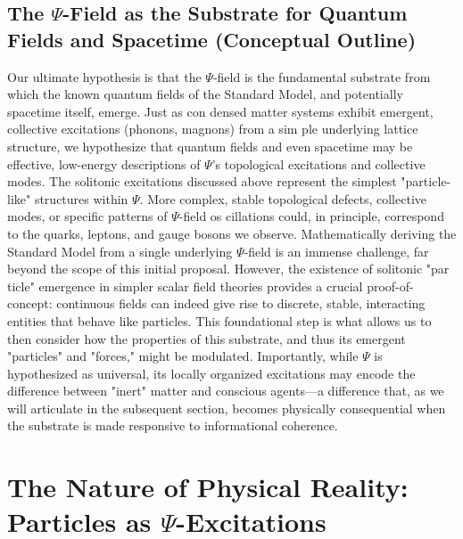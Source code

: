 \documentclass{report}
\begin{document}
    \subsection{The $\Psi$-Field as the Substrate for Quantum Fields and Spacetime (Conceptual Outline)}
    \label{subsec:psi_substrate_qft_st}
    Our ultimate hypothesis is that the $\Psi$-field is the fundamental substrate from which the known
    quantum fields of the Standard Model, and potentially spacetime itself, emerge. Just as con densed matter systems exhibit emergent, collective excitations (phonons, magnons) from a sim ple underlying lattice structure, we hypothesize that quantum fields and even spacetime may
    be effective, low-energy descriptions of $\Psi$’s topological excitations and collective modes. The
    solitonic excitations discussed above represent the simplest "particle-like" structures within $\Psi$.
    More complex, stable topological defects, collective modes, or specific patterns of $\Psi$-field os cillations could, in principle, correspond to the quarks, leptons, and gauge bosons we observe.
    Mathematically deriving the Standard Model from a single underlying $\Psi$-field is an immense
    challenge, far beyond the scope of this initial proposal. However, the existence of solitonic "par ticle" emergence in simpler scalar field theories provides a crucial proof-of-concept: continuous
    fields can indeed give rise to discrete, stable, interacting entities that behave like particles. This
    foundational step is what allows us to then consider how the properties of this substrate, and thus
    its emergent "particles" and "forces," might be modulated. Importantly, while $\Psi$ is hypothesized
    as universal, its locally organized excitations may encode the difference between "inert" matter
    and conscious agents—a difference that, as we will articulate in the subsequent section, becomes
    physically consequential when the substrate is made responsive to informational coherence.

\section{The Nature of Physical Reality: Particles as $\Psi$-Excitations}
\label{sec:particles_as_psi_excitations}
\end{document}
